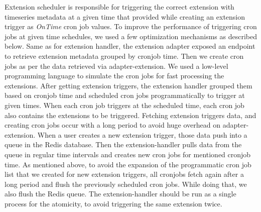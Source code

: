 Extension scheduler is responsible for triggering the correct extension with timeseries metadata at a given time that provided while creating an extension trigger as \emph{OnTime} cron job values. To improve the performance of triggering cron jobs at given time schedules, we used a few optimization mechanisms as described below. 
Same as for extension handler, the extension adapter exposed an endpoint to retrieve extension metadata grouped by cronjob time. Then we create cron jobs as per the data retrieved via adapter-extension. We used a low-level programming language to simulate the cron jobs for fast processing the extensions. After getting extension triggers, the extension handler grouped them based on cronjob time and scheduled cron jobs programmatically to trigger at given times. 
When each cron job triggers at the scheduled time, each cron job also contains the extensions to be triggered. Fetching extension triggers data, and creating cron jobs occur with a long period to avoid huge overhead on adapter-extension. When a user creates a new extension trigger, those data push into a queue in the Redis database. Then the extension-handler pulls data from the queue in regular time intervals and creates new cron jobs for mentioned cronjob time. 
As mentioned above, to avoid the expansion of the programmatic cron job list that we created for new extension triggers, all cronjobs fetch again after a long period and flush the previously scheduled cron jobs. While doing that, we also flush the Redis queue.
The extension-handler should be run as a single process for the atomicity, to avoid triggering the same extension twice.